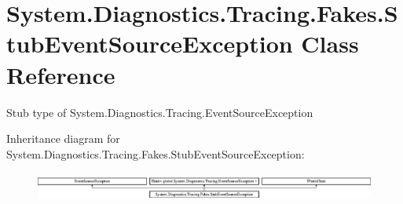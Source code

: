 \hypertarget{class_system_1_1_diagnostics_1_1_tracing_1_1_fakes_1_1_stub_event_source_exception}{\section{System.\-Diagnostics.\-Tracing.\-Fakes.\-Stub\-Event\-Source\-Exception Class Reference}
\label{class_system_1_1_diagnostics_1_1_tracing_1_1_fakes_1_1_stub_event_source_exception}
}


Stub type of System.\-Diagnostics.\-Tracing.\-Event\-Source\-Exception 


Inheritance diagram for System.\-Diagnostics.\-Tracing.\-Fakes.\-Stub\-Event\-Source\-Exception\-:\begin{figure}[H]
\begin{center}
\leavevmode
\includegraphics[height=0.938023cm]{class_system_1_1_diagnostics_1_1_tracing_1_1_fakes_1_1_stub_event_source_exception}
\end{center}
\end{figure}
